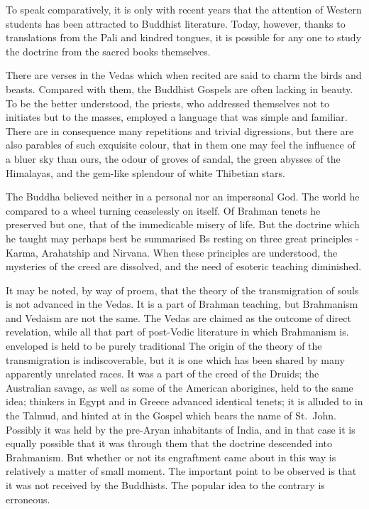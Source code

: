 \documentclass[]{book}
\begin{document}
To speak comparatively, it is only with recent years that the attention
of Western students has been attracted to Buddhist literature. Today,
however, thanks to translations from the Pali and kindred tongues, it is
possible for any one to study the doctrine from the sacred books
themselves.

There are verses in the Vedas which when recited are said to charm the
birds and beasts. Compared with them, the Buddhist Gospels are often
lacking in beauty. To be the better understood, the priests, who
addressed themselves not to initiates but to the masses, employed a
language that was simple and familiar. There are in consequence many
repetitions and trivial digressions, but there are also parables of such
exquisite colour, that in them one may feel the influence of a bluer sky
than ours, the odour of groves of sandal, the green abysses of the
Himalayas, and the gem-like splendour of white Thibetian stars.

The Buddha believed neither in a personal nor an impersonal God. The
world he compared to a wheel turning ceaselessly on itself. Of Brahman
tenets he preserved but one, that of the immedicable misery of life. But
the doctrine which he taught may perhaps best be summarised Bs resting
on three great principles - Karma, Arahatship and Nirvana. When these
principles are understood, the mysteries of the creed are dissolved, and
the need of esoteric teaching diminished.

It may be noted, by way of proem, that the theory of the transmigration
of souls is not advanced in the Vedas. It is a part of Brahman teaching,
but Brahmanism and Vedaism are not the same. The Vedas are claimed as
the outcome of direct revelation, while all that part of post-Vedic
literature in which Brahmanism is. enveloped is held to be purely
traditional The origin of the theory of the transmigration is
indiscoverable, but it is one which has been shared by many apparently
unrelated races. It was a part of the creed of the Druids; the
Australian savage, as well as some of the American aborigines, held to
the same idea; thinkers in Egypt and in Greece advanced identical
tenets; it is alluded to in the Talmud, and hinted at in the Gospel
which bears the name of St.~John. Possibly it was held by the pre-Aryan
inhabitants of India, and in that case it is equally possible that it
was through them that the doctrine descended into Brahmanism. But
whether or not its engraftment came about in this way is relatively a
matter of small moment. The important point to be observed is that it
was not received by the Buddhists. The popular idea to the contrary is
erroneous.
\end{document}
